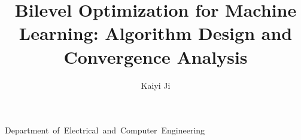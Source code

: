 \documentclass{osudissert96}
\begin{document}
%
%

\author{Kaiyi Ji}
\title{Bilevel Optimization for Machine Learning: Algorithm Design and Convergence Analysis}
\unit{Department of Electrical and Computer Engineering}



%
%

\maketitle


\disscopyright
\end{document}
